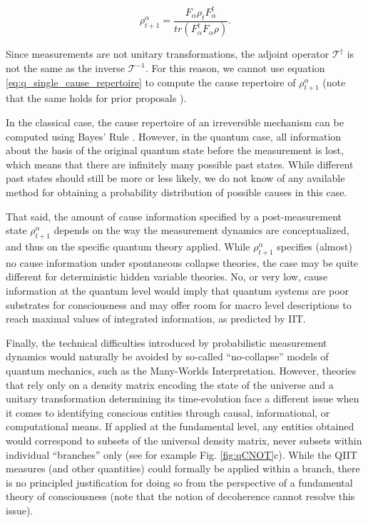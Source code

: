 \documentclass[preprints, article, accept, pdftex, moreauthors, letterpaper]{Definitions/mdpi}
\renewcommand{\=}[1]{\stackrel{#1}{=}} %
\newcommand{\T}{\mathcal{T}} %
\renewcommand{\*}{\otimes}%
\begin{document}
\begin{equation}
\label{eq:c_measurement}
    \rho^{\alpha}_{t+1} =  \frac{F_\alpha \rho_t F_\alpha^\dag}{tr(F_\alpha^\dag F_\alpha \rho)}.
\end{equation}

Since measurements are not unitary transformations, the adjoint operator $\T^\dag$ is not the same as the inverse $\T^{-1}$. For this reason, we cannot use equation \eqref{eq:q_single_cause_repertoire} to compute the cause repertoire of $\rho^{\alpha}_{t+1}$ (note that the same holds for prior proposals \cite{Zanardi2018, Kleiner2021}). 

In the classical case, the cause repertoire of an irreversible mechanism can be computed using Bayes' Rule \cite{Barbosa2021, Albantakis2022_4_0}. However, in the quantum case, all information about the basis of the original quantum state before the measurement is lost, which means that there are infinitely many possible past states. While different past states should still be more or less likely, we do not know of any available method for obtaining a probability distribution of possible causes in this case. 

That said, the amount of cause information specified by a post-measurement state $\rho^{\alpha}_{t+1}$ depends on the way the measurement dynamics are conceptualized, and thus on the specific quantum theory applied. 
While $\rho^{\alpha}_{t+1}$ specifies (almost) no cause information under spontaneous collapse theories, the case may be quite different for deterministic hidden variable theories. 
No, or very low, cause information at the quantum level would imply that quantum systems are poor substrates for consciousness and may offer room for macro level descriptions to reach maximal values of integrated information, as predicted by IIT.

Finally, the technical difficulties introduced by probabilistic measurement dynamics would naturally be avoided by so-called ``no-collapse'' models of quantum mechanics, such as the Many-Worlds Interpretation. However, theories that rely only on a density matrix encoding the state of the universe and a unitary transformation determining its time-evolution \cite{Tegmark2015} face a different issue when it comes to identifying conscious entities through causal, informational, or computational means. If applied at the fundamental level, any entities obtained would correspond to subsets of the universal density matrix, never subsets within individual ``branches'' only (see for example Fig. \ref{fig:qCNOT}c). While the QIIT measures (and other quantities) could formally be applied within a branch, there is no principled justification for doing so from the perspective of a fundamental theory of consciousness (note that the notion of decoherence cannot resolve this issue).  
\end{document}
